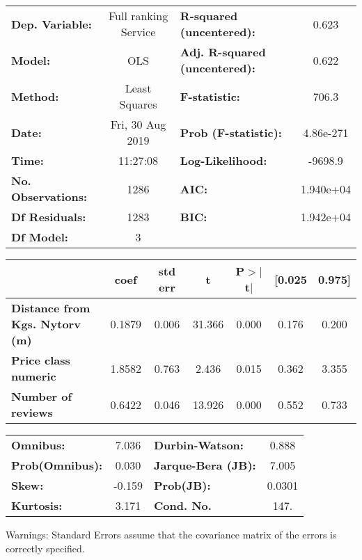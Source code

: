\documentclass{report}
\begin{document}
\begin{center}
\begin{tabular}{lclc}
\toprule
\textbf{Dep. Variable:}                & Full ranking Service & \textbf{  R-squared (uncentered):}      &     0.623   \\
\textbf{Model:}                        &         OLS          & \textbf{  Adj. R-squared (uncentered):} &     0.622   \\
\textbf{Method:}                       &    Least Squares     & \textbf{  F-statistic:       }          &     706.3   \\
\textbf{Date:}                         &   Fri, 30 Aug 2019   & \textbf{  Prob (F-statistic):}          & 4.86e-271   \\
\textbf{Time:}                         &       11:27:08       & \textbf{  Log-Likelihood:    }          &   -9698.9   \\
\textbf{No. Observations:}             &          1286        & \textbf{  AIC:               }          & 1.940e+04   \\
\textbf{Df Residuals:}                 &          1283        & \textbf{  BIC:               }          & 1.942e+04   \\
\textbf{Df Model:}                     &             3        & \textbf{                     }          &             \\
\bottomrule
\end{tabular}
\begin{tabular}{lcccccc}
                                       & \textbf{coef} & \textbf{std err} & \textbf{t} & \textbf{P$> |$t$|$} & \textbf{[0.025} & \textbf{0.975]}  \\
\midrule
\textbf{Distance from Kgs. Nytorv (m)} &       0.1879  &        0.006     &    31.366  &         0.000        &        0.176    &        0.200     \\
\textbf{Price class numeric}           &       1.8582  &        0.763     &     2.436  &         0.015        &        0.362    &        3.355     \\
\textbf{Number of reviews}             &       0.6422  &        0.046     &    13.926  &         0.000        &        0.552    &        0.733     \\
\bottomrule
\end{tabular}
\begin{tabular}{lclc}
\textbf{Omnibus:}       &  7.036 & \textbf{  Durbin-Watson:     } &    0.888  \\
\textbf{Prob(Omnibus):} &  0.030 & \textbf{  Jarque-Bera (JB):  } &    7.005  \\
\textbf{Skew:}          & -0.159 & \textbf{  Prob(JB):          } &   0.0301  \\
\textbf{Kurtosis:}      &  3.171 & \textbf{  Cond. No.          } &     147.  \\
\bottomrule
\end{tabular}
\end{center}

Warnings: \newline
 [1] Standard Errors assume that the covariance matrix of the errors is correctly specified.
\end{document}
